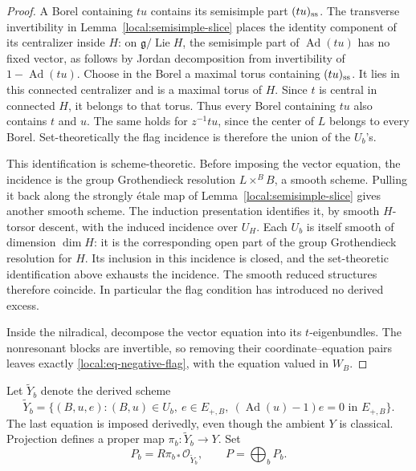 \documentclass[11pt]{article}
\numberwithin{equation}{section}
\theoremstyle{definition}
\theoremstyle{remark}
\newcommand{\g}{\mathfrak g}
\newcommand{\cO}{\mathcal O}
\newcommand{\Ad}{\operatorname{Ad}}
\newcommand{\Lie}{\operatorname{Lie}}
\begin{document}
\begin{proof}
A Borel containing $tu$ contains its semisimple part $(tu)_{\rm ss}$.
The transverse invertibility in Lemma~\ref{local:semisimple-slice}
places the identity component of its centralizer inside $H$:
on $\g/\Lie H$, the semisimple part of $\Ad(tu)$ has no fixed
vector, as follows by Jordan decomposition from invertibility of
$1-\Ad(tu)$.  Choose in the Borel a maximal torus containing
$(tu)_{\rm ss}$.  It lies in this connected centralizer and is
a maximal torus of $H$.  Since $t$ is central in connected $H$,
it belongs to that torus.  Thus every Borel containing $tu$ also
contains $t$ and $u$.  The same holds for $z^{-1}tu$, since the
center of $L$ belongs to every Borel.  Set-theoretically the flag
incidence is therefore the union of the $U_b$'s.

This identification is scheme-theoretic.  Before imposing the
vector equation, the incidence is the group Grothendieck resolution
$L\mathbin{\times}^{B}B$, a smooth scheme.  Pulling it back along
the strongly \'etale map of Lemma~\ref{local:semisimple-slice}
gives another smooth scheme.  The induction presentation identifies
it, by smooth $H$-torsor descent, with the induced incidence over
$U_H$.  Each $U_b$ is itself smooth of dimension $\dim H$: it is
the corresponding open part of the group Grothendieck resolution
for $H$.  Its inclusion in this incidence is closed, and the
set-theoretic identification above exhausts the incidence.  The
smooth reduced structures therefore coincide.  In particular the
flag condition has introduced no derived excess.

Inside the nilradical, decompose the vector equation into its
$t$-eigenbundles.  The nonresonant blocks are invertible, so removing
their coordinate--equation pairs leaves exactly
\eqref{local:eq-negative-flag}, with the equation valued in $W_B$.
\end{proof}

Let $\widetilde Y_b$ denote the derived scheme
\begin{equation}\label{local:eq-positive-flag}
 \widetilde Y_b=
 \{(B,u,e):(B,u)\in U_b,\ e\in E_{+,B},
                 \ (\Ad(u)-1)e=0\text{ in }E_{+,B}\}.
\end{equation}
The last equation is imposed derivedly, even though the ambient
$Y$ is classical.  Projection defines a proper map
$\pi_b:\widetilde Y_b\to Y$.  Set
\begin{equation}\label{eq:flag-test}
 P_b=R\pi_{b*}\cO_{\widetilde Y_b},\qquad P=\bigoplus_b P_b.
\end{equation}
\end{document}
